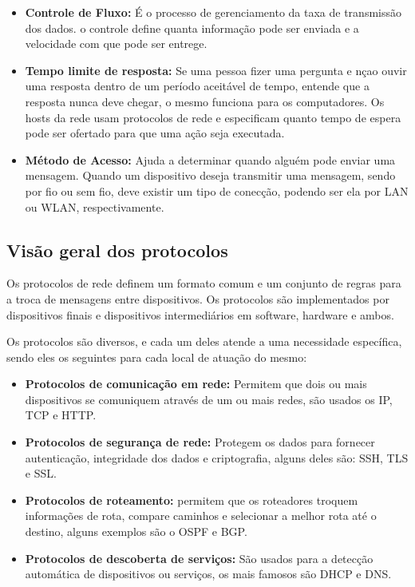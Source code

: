 \documentclass[12pt a4paper]{paper}
\begin{document}
\begin{itemize}
  \item \textbf{Controle de Fluxo: } É o processo de gerenciamento  da taxa de transmissão dos dados. o controle define quanta informação pode ser enviada e a velocidade com que pode ser entrege.
  \item \textbf{Tempo limite de resposta: } Se uma pessoa fizer uma pergunta e nçao ouvir uma resposta dentro de um período aceitável de tempo, entende que a resposta nunca deve chegar, o mesmo funciona para os computadores. Os hosts da rede usam protocolos de rede e especificam quanto tempo de espera pode ser ofertado para que uma ação seja executada.
  \item \textbf{Método de Acesso: } Ajuda a determinar quando alguém pode enviar uma mensagem. Quando um dispositivo deseja transmitir uma mensagem, sendo por fio ou sem fio, deve existir um tipo de conecção, podendo ser ela por LAN ou WLAN, respectivamente.
\end{itemize}

\subsection{Visão geral dos protocolos} %
\label{sub:Visão geral dos protocolos}
Os protocolos de rede definem um formato comum e um conjunto de regras para a troca 
de mensagens entre dispositivos. Os protocolos são implementados por dispositivos 
finais e dispositivos intermediários em software, hardware e ambos.

Os protocolos são diversos, e cada um deles atende a uma necessidade específica, sendo 
eles os seguintes para cada local de atuação do mesmo: 

\begin{itemize}
  \item \textbf{Protocolos de comunicação em rede: } Permitem que dois ou mais dispositivos se comuniquem através de um ou mais redes, são usados os IP, TCP e HTTP. 
  \item \textbf{Protocolos de segurança de rede: }Protegem os dados para fornecer autenticação, integridade dos dados e criptografia, alguns deles são: SSH, TLS e SSL. 
  \item \textbf{Protocolos de roteamento: } permitem que os roteadores troquem informações de rota, compare caminhos e selecionar a melhor rota até o destino, alguns exemplos são o OSPF e BGP. 
  \item \textbf{Protocolos de descoberta de serviços: } São usados para a detecção automática de dispositivos ou serviços, os mais famosos são DHCP e DNS.
\end{itemize}
\end{document}
